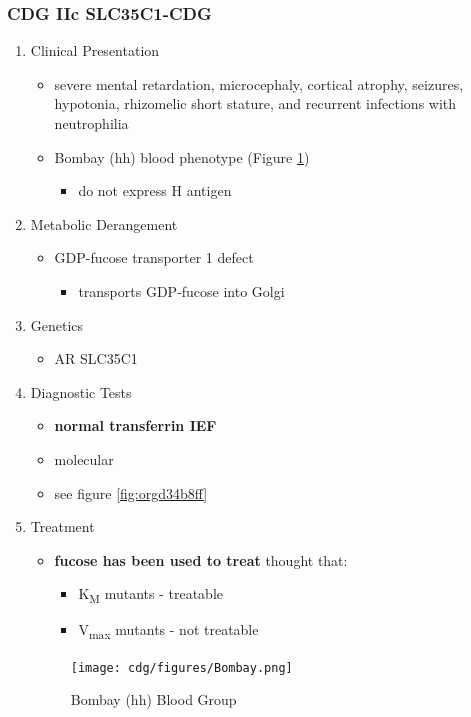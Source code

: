 \documentclass[12pt]{scrartcl}
\begin{document}
\subsubsection{CDG IIc SLC35C1-CDG}
\label{sec:orgb27fee4}
\begin{enumerate}
\item Clinical Presentation
\label{sec:orgc97d75c}
\begin{itemize}
\item severe mental retardation, microcephaly, cortical atrophy, seizures,
hypotonia, rhizomelic short stature, and recurrent infections with
neutrophilia
\item Bombay (hh) blood phenotype (Figure \ref{fig:orgfc31739})
\begin{itemize}
\item do not express H antigen
\end{itemize}
\end{itemize}
\item Metabolic Derangement
\label{sec:org3345992}
\begin{itemize}
\item GDP-fucose transporter 1 defect
\begin{itemize}
\item transports GDP-fucose into Golgi
\end{itemize}
\end{itemize}
\item Genetics
\label{sec:org86ebc7a}
\begin{itemize}
\item AR SLC35C1
\end{itemize}

\item Diagnostic Tests
\label{sec:org2d7d3dc}
\begin{itemize}
\item \textbf{normal transferrin IEF}
\item molecular
\item see figure \ref{fig:orgd34b8ff}
\end{itemize}
\item Treatment
\label{sec:org8988c44}
\begin{itemize}
\item \textbf{fucose has been used to treat} thought that:
\begin{itemize}
\item K\textsubscript{M} mutants - treatable
\item V\textsubscript{max} mutants - not treatable
\end{itemize}
\end{itemize}

\begin{figure}[htbp]
\centering
\texttt{[image: cdg/figures/Bombay.png]}
\caption[Hh]{\label{fig:orgfc31739}Bombay (hh) Blood Group}
\end{figure}
\end{enumerate}
\end{document}
